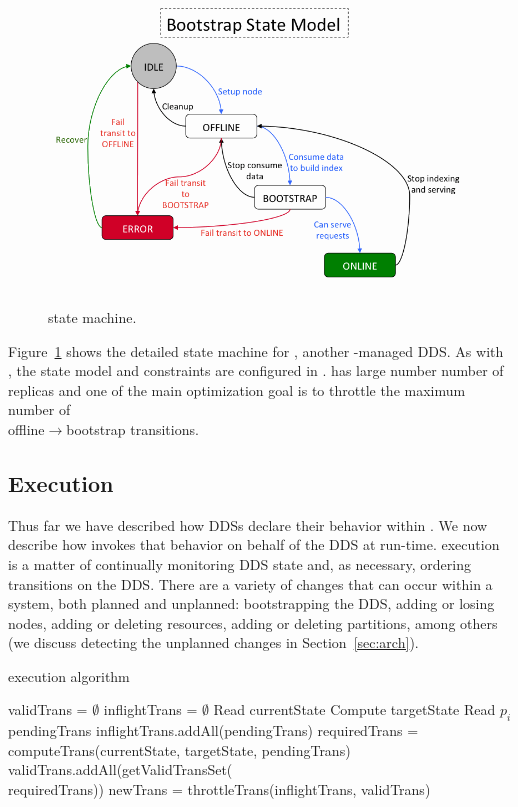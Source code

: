 \begin{figure}[t]
    {\includegraphics[width=\columnwidth]{bootstrap_statemodel.png}}
    \vspace*{-2ex}
    \caption{\label{fig:bootstrap_statemodel} \seas state machine.}
\end{figure}

Figure~\ref{fig:bootstrap_statemodel} shows the detailed state machine for \seas, another
\helix-managed DDS. As with \\ \ES, the state model and
constraints are configured in \helix. \seas has large number
number of replicas and one of the main optimization goal is to throttle the
maximum number of \\
offline$\rightarrow$bootstrap transitions. 

\subsection{\helix Execution}
%
Thus far we have described how DDSs declare their behavior within \helix.  We
now describe how \helix invokes that behavior on behalf of the DDS at run-time.  
\helix execution is a matter of continually monitoring DDS state and, as
necessary, ordering transitions on the DDS.   There are a variety of changes 
that can occur within a system, both planned and unplanned: bootstrapping the
DDS, adding or losing nodes, adding or deleting resources, adding or deleting
partitions, among others (we discuss detecting the unplanned changes in
Section~\ref{sec:arch}).

\begin{algorithm}
\label{alg:execution}
\caption{\helix execution algorithm}
\begin{algorithmic}[1]
\REPEAT
\STATE validTrans = $\emptyset$
\STATE inflightTrans = $\emptyset$
  \STATE Read currentState
  \STATE Compute targetState 
  \STATE Read $p_i$ pendingTrans
  \STATE inflightTrans.addAll(pendingTrans)
  \STATE requiredTrans = computeTrans(currentState, targetState, 
pendingTrans) 
  \STATE validTrans.addAll(getValidTransSet( \\ requiredTrans))
\ENDFOR
\STATE newTrans = throttleTrans(inflightTrans, validTrans) 
\end{algorithmic}
\end{algorithm}


